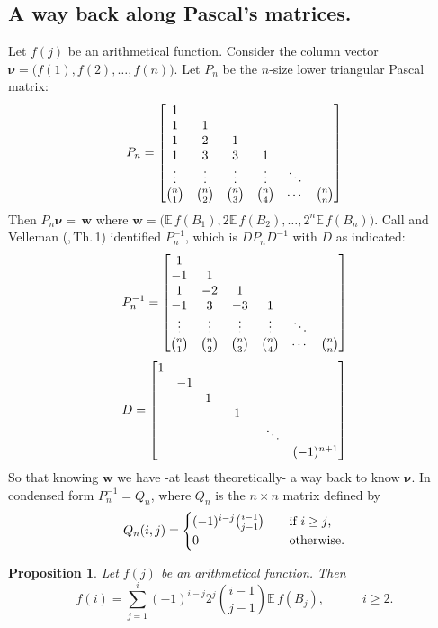\documentclass[11pt,draft,reqno]{amsart}
\newtheorem{proposition}[theorem]{Proposition}
\theoremstyle{definition}
\theoremstyle{remarks}
\numberwithin{equation}{section}
\def \m{{\mu}}
\def \qq{{\qquad}}
\def\P{{\mathcal P}}
\def\E{{\mathbb E \,}}
\def\P{{\mathbb P}}
\def\beq{\begin{equation}}
\def\eeq{\end{equation}}
\begin{document}
\subsection{A  way back along Pascal's matrices.}\label{sub.bin.way.back}
 Let $f(j)$ be an arithmetical function. Consider the column vector ${\boldsymbol \nu}=\big(f(1),f(2),\ldots, f(n)\big)$. Let $P_n$ be the $n$-size   lower triangular Pascal matrix:
\begin{eqnarray*}P_n={ \left[\begin{matrix}
1        \cr
1   &1       \cr
1        &2            &1    \cr
1       &3       &3 &1       \cr
 \vdots         &   \vdots                  &\vdots   &\vdots   &\ddots    
 \cr {{n}\choose{1}}& {{n}\choose{2}}&{{n}\choose{3}}&{{n}\choose{4}}  &\cdots  &{{n}\choose{n}}\end{matrix} \right]}
\end{eqnarray*}
Then $P_n{\boldsymbol \nu}=  \,{\boldsymbol w}$ where ${\boldsymbol w}=\big(\E f(B_1),2\E f(B_2),\ldots, 2^n\E f(B_n)\big)$. Call and Velleman (\cite{CV},\,Th.\,1)  
 identified $P^{-1}_n$, which is $DP_nD^{-1}$ with $D$ as indicated:
\begin{eqnarray*}P^{-1}_n={ \left[\begin{matrix}
1        \cr
-1  & 1       \cr
1        &-2            &1    \cr
-1       &3       &-3 &1       \cr
 \vdots         &   \vdots                  &\vdots   &\vdots   &\ddots    
 \cr {{n}\choose{1}}& {{n}\choose{2}}&{{n}\choose{3}}&{{n}\choose{4}}  &\cdots  &{{n}\choose{n}}\end{matrix} \right]}
\end{eqnarray*}
\begin{eqnarray*}D={ \left[\begin{matrix}
1        \cr
  &-1       \cr
       &{}      &1    \cr
  &{}          &{}         &-1       \cr
 &{}          &{}   &{}          &{}  &\ddots    
 \cr &{}          &{}   &{}          &{}    &   &(-1)^{n+1}\end{matrix} \right]}
\end{eqnarray*}
 So that knowing ${\boldsymbol w}$  we have -at least theoretically- a way back to know ${\boldsymbol \nu}$. In  condensed form     
$P_n^{-1}=Q_n$,  where  
$Q_n$ is the $n\times n$ matrix defined by   \begin{equation}Q_n(i,j)=\begin{cases} (-1)^{i-j}  {{i-1} \choose{j-1}} \quad&\hbox{if $i\ge j$,}\cr
 0 \quad&\hbox{otherwise.}
 \end{cases}
 \end{equation}  
   \begin{proposition}\label{way.back}Let $f(j)$ be an arithmetical function. Then
\beq\label{} f(i)=\sum_{j=1}^i  (-1)^{i-j}2^j{{i-1}\choose{j-1}}\E f(B_j),\qq\quad i\ge 2.
\eeq \end{proposition}
  
\end{document}
